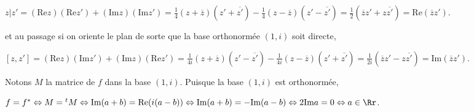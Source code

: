 {\begin{enumerate}
{\begin{center}
$z|z'= (\text{Re}z)(\text{Re}z')+(\text{Im}z)(\text{Im}z') =\frac{1}{4}(z+\overline{z})(z'+\overline{z'})-\frac{1}{4}(z-\overline{z})(z'-\overline{z'})=\frac{1}{2}(\overline{z}z'+z\overline{z'}) =\text{Re}(\overline{z}z')$.
\end{center}

et au passage si on oriente le plan de sorte que la base orthonormée $(1,i)$ soit directe,

\begin{center}
$[z,z']= (\text{Re}z)(\text{Im}z')+(\text{Im}z)(\text{Re}z') =\frac{1}{4i}(z+\overline{z})(z'-\overline{z'})-\frac{1}{4i}(z-\overline{z})(z'+\overline{z'})=\frac{1}{2i}(\overline{z}z'-z\overline{z'}) =\text{Im}(\overline{z}z')$.
\end{center}

Notons $M$ la matrice de $f$ dans la base $(1,i)$. Puisque la base $(1,i)$ est orthonormée,

\begin{center}
$f = f^*\Leftrightarrow M ={^t}M\Leftrightarrow\text{Im}(a+b) =\text{Re}(i(a-b))\Leftrightarrow\text{Im}(a+b) =-\text{Im}(a-b)\Leftrightarrow2\text{Im}a = 0\Leftrightarrow a\in\Rr$.
\end{center}

\begin{center}
\end{center}}
\end{enumerate}
}